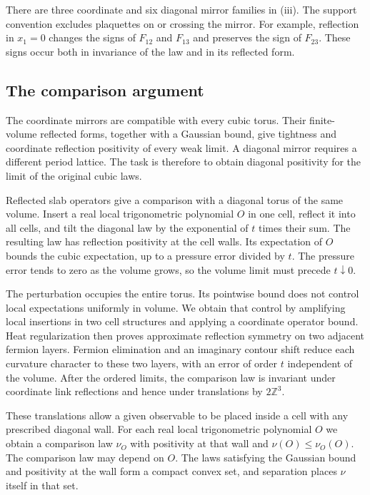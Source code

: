 \documentclass[11pt,letterpaper,reqno]{amsart}
\newcommand{\Z}{\mathbb Z}
\begin{document}
There are three coordinate and six diagonal mirror families in
\textup{(iii)}. The support convention excludes plaquettes on or
crossing the mirror. For example, reflection in $x_1=0$ changes the
signs of $F_{12}$ and $F_{13}$ and preserves the sign of $F_{23}$.
These signs occur both in invariance of the law and in its reflected
form.

\subsection{The comparison argument}

The coordinate mirrors are compatible with every cubic torus. Their
finite-volume reflected forms, together with a Gaussian bound,
give tightness and coordinate reflection positivity of every weak
limit. A diagonal mirror requires a different period lattice.
The task is therefore to obtain diagonal positivity for the limit
of the original cubic laws.

Reflected slab operators give a comparison with a diagonal torus
of the same volume. Insert a real local trigonometric polynomial
$O$ in one cell, reflect it into all cells, and tilt the diagonal
law by the exponential of $t$ times their sum. The resulting law
has reflection positivity at the cell walls. Its expectation of
$O$ bounds the cubic expectation, up to a pressure error divided
by $t$. The pressure error tends to zero as the volume grows, so
the volume limit must precede $t\downarrow0$.

The perturbation occupies the entire torus. Its pointwise bound
does not control local expectations uniformly in volume. We obtain
that control by amplifying local insertions in two cell structures
and applying a coordinate operator bound. Heat regularization then
proves approximate reflection symmetry on two adjacent fermion
layers. Fermion elimination and an imaginary contour shift reduce
each curvature character to these two layers, with an error of
order $t$ independent of the volume. After the ordered limits,
the comparison law is invariant under coordinate link reflections
and hence under translations by $2\Z^3$.

These translations allow a given observable to be placed inside a
cell with any prescribed diagonal wall. For each real local
trigonometric polynomial $O$ we obtain a comparison law $\nu_O$
with positivity at that wall and
$\nu(O)\le\nu_O(O)$. The comparison law may depend on $O$.
The laws satisfying the Gaussian bound and positivity at the wall
form a compact convex set, and separation places $\nu$ itself in
that set.
\end{document}
